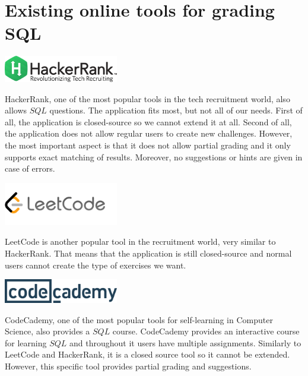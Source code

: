 \newcommand{\cmark}{\ding{51}}%
\newcommand{\xmark}{\ding{55}}%
\section{Existing online tools for grading SQL}\label{literature_review:online}

\begin{center}
    \includegraphics[width=50mm,scale=0.5]{images/HackerRank.png}
\end{center}
HackerRank, one of the most popular tools in the tech recruitment world,
also allows $SQL$ questions. The application fits most, but not all of our
needs. First of all, the application is closed-source so we cannot
extend it at all. Second of all, the application does not allow regular
users to create new challenges. However, the most important aspect is
that it does not allow partial grading and it only supports exact matching
of results. Moreover, no suggestions or hints are given in case of errors.

\begin{center}
    \includegraphics[width=50mm,scale=0.5]{images/LeetCode.png}
\end{center}
LeetCode is another popular tool in the recruitment world, very similar to
HackerRank. That means that the application is still closed-source and
normal users cannot create the type of exercises we want.

\begin{center}
    \includegraphics[width=50mm,scale=0.5]{images/CodeCademy.png}
\end{center}
CodeCademy, one of the most popular tools for self-learning in Computer
Science, also provides a $SQL$ course. CodeCademy provides an interactive
course for learning $SQL$ and throughout it users have multiple assignments.
Similarly to LeetCode and HackerRank, it is a closed source tool so it cannot be
extended. However, this specific tool provides partial grading and suggestions.

